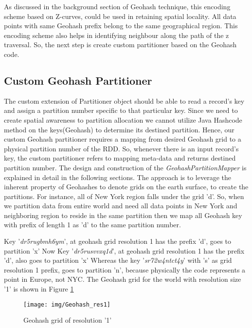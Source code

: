 \documentclass[article,type=msc,colorback,10pt,accentcolor=tud1d]{tudthesis}
\begin{document}
				As discussed in the background section of Geohash technique, this encoding scheme based on Z-curves, could be used in retaining spatial locality. All data points with same Geohash prefix belong to the same geographical region. This encoding scheme also helps in identifying neighbour along the path of the z traversal. So, the next step is create custom partitioner based on the Geohash code.

		
		\subsection{Custom Geohash Partitioner}
		
		\par The custom extension of Partitioner object should be able to read a record's key and assign a partition number specific to that particular key. Since we need to create spatial awareness to partition allocation we cannot utilize Java Hashcode method on the keys(Geohash) to determine its destined partition. Hence, our custom Geohash partitioner requires a mapping from desired Geohash grid to a physical partition number of the RDD. So, whenever there is an input record's key, the custom partitioner refers to mapping meta-data and returns destined partition number. The design and construction of the \textit{GeohashPartitionMapper} is explained in detail in the following sections.
		The approach is to leverage the inherent property of Geohashes to denote grids on the earth surface, to create the partitions. For instance, all of New York region falls under the grid 'd'. So, when we partition data from entire world and need all data points in New York and neighboring region to reside in the same partition then we map all Geohash key with prefix of length 1 as 'd' to the same partition number.  
		
		Key '\textit{dr5rugbmh6ym}', at geohash grid resolution 1 has the prefix 'd', goes to partition 'x'
		Now Key '\textit{dr5rusvvxq1d}', at geohash grid resolution 1 has the prefix 'd', also goes to partition 'x'
		Whereas the key '\textit{sr72w4ntct4y}' with 's' as grid resolution 1 prefix, goes to partition 'n', because physically the code represents a point in Europe, not NYC. The Geohash grid for the world with resolution size '1' is shown in Figure \ref{fig:Geohash_res1}
							
			\begin{figure}[h]
			\centering
			\texttt{[image: img/Geohash\_res1]}
			\caption{Geohash grid of resolution '1'}
			\label{fig:Geohash_res1}
			\end{figure}
		
\end{document}
